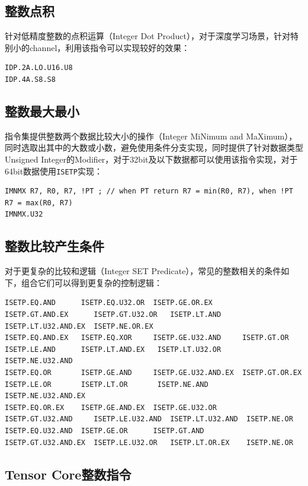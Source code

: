 \subsection{整数点积}

针对低精度整数的点积运算（Integer Dot Product），对于深度学习场景，针对特别小的channel，利用该指令可以实现较好的效果：

\begin{lstlisting}
IDP.2A.LO.U16.U8
IDP.4A.S8.S8
\end{lstlisting}

\subsection{整数最大最小}

指令集提供整数两个数据比较大小的操作（Integer MiNimum and MaXimum），同时选取出其中的大数或小数，避免使用条件分支实现，同时提供了针对数据类型Unsigned Integer的Modifier，对于32bit及以下数据都可以使用该指令实现，对于64bit数据使用\lstinline|ISETP|实现：

\begin{lstlisting}
IMNMX R7, R0, R7, !PT ; // when PT return R7 = min(R0, R7), when !PT R7 = max(R0, R7)
IMNMX.U32
\end{lstlisting}

\subsection{整数比较产生条件}

对于更复杂的比较和逻辑（Integer SET Predicate），常见的整数相关的条件如下，组合它们可以得到更复杂的控制逻辑：

\begin{lstlisting}
ISETP.EQ.AND      ISETP.EQ.U32.OR  ISETP.GE.OR.EX       ISETP.GT.AND.EX      ISETP.GT.U32.OR   ISETP.LT.AND      ISETP.LT.U32.AND.EX  ISETP.NE.OR.EX
ISETP.EQ.AND.EX   ISETP.EQ.XOR     ISETP.GE.U32.AND     ISETP.GT.OR          ISETP.LE.AND      ISETP.LT.AND.EX   ISETP.LT.U32.OR      ISETP.NE.U32.AND
ISETP.EQ.OR       ISETP.GE.AND     ISETP.GE.U32.AND.EX  ISETP.GT.OR.EX       ISETP.LE.OR       ISETP.LT.OR       ISETP.NE.AND         ISETP.NE.U32.AND.EX
ISETP.EQ.OR.EX    ISETP.GE.AND.EX  ISETP.GE.U32.OR      ISETP.GT.U32.AND     ISETP.LE.U32.AND  ISETP.LT.U32.AND  ISETP.NE.OR
ISETP.EQ.U32.AND  ISETP.GE.OR      ISETP.GT.AND         ISETP.GT.U32.AND.EX  ISETP.LE.U32.OR   ISETP.LT.OR.EX    ISETP.NE.OR
\end{lstlisting}

\subsection{Tensor Core整数指令}

